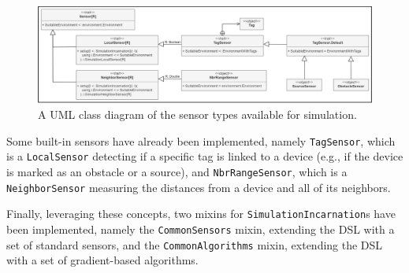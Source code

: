 \begin{figure}[!ht]
  \centering
  \includegraphics[width=1\textwidth]{resources/figures/sensor-class-diagram.png}
  \caption[A UML class diagram of the sensor types in FRASP]{
    A UML class diagram of the sensor types available for simulation.
  }
  \label{figure:sensor-class-diagram}
\end{figure}

Some built-in sensors have already been implemented, namely \texttt{TagSensor},
which is a \texttt{LocalSensor} detecting if a specific tag is linked to a
device (e.g., if the device is marked as an obstacle or a source), and
\texttt{NbrRangeSensor}, which is a \texttt{NeighborSensor} measuring the
distances from a device and all of its neighbors.

Finally, leveraging these concepts, two mixins for
\texttt{SimulationIncarnation}s have been implemented, namely the
\texttt{CommonSensors} mixin, extending the \ac{DSL} with a set of standard
sensors, and the \texttt{CommonAlgorithms} mixin, extending the \ac{DSL} with a
set of gradient-based algorithms.
